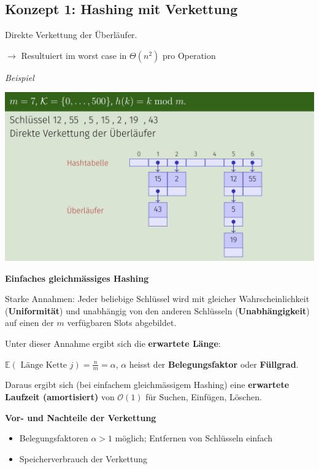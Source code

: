 \begin{sectionbox}
\subsection{Konzept 1: Hashing mit Verkettung}\par\smallskip
Direkte Verkettung der Überläufer.\par
$\rightarrow$ Resultuiert im worst case in $\Theta(n^{2})$ pro Operation\par\smallskip

\textit{Beispiel}\par
\begin{center}
    \includegraphics[width = \columnwidth]{../img/hashVerkettung.png}
\end{center}\smallskip

\textbf{Einfaches gleichmässiges Hashing}\par
Starke Annahmen: Jeder beliebige Schlüssel wird mit gleicher Wahrscheinlichkeit (\textbf{Uniformität}) und unabhängig von den anderen Schlüsseln (\textbf{Unabhängigkeit}) auf einen der $m$ verfügbaren Slots abgebildet.\par\smallskip
Unter dieser Annahme ergibt sich die \textbf{erwartete Länge}:\par $\mathbb{E}(\text { Länge Kette } j)=\frac{n}{m}=\alpha$, $\alpha$ heisst der \textbf{Belegungsfaktor} oder \textbf{Füllgrad}.\par\smallskip
Daraus ergibt sich (bei einfachem gleichmässigem Hashing) eine \textbf{erwartete Laufzeit (amortisiert)} von $\mathcal{O}(1)$ für Suchen, Einfügen, Löschen.\par\smallskip
\textbf{Vor- und Nachteile der Verkettung}\par
\begin{itemize}
    \item Belegungsfaktoren $\alpha > 1$ möglich; Entfernen von Schlüsseln einfach
    \item Speicherverbrauch der Verkettung
\end{itemize}\smallskip

\end{sectionbox}
